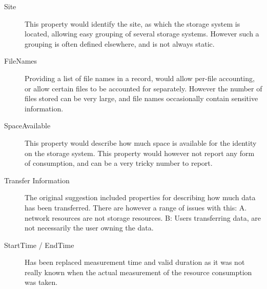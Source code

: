 \begin{description}

\item[Site] This property would identify the site, as which the storage system
is located, allowing easy grouping of several storage systems. However such a
grouping is often defined elsewhere, and is not always static.

\item[FileNames] Providing a list of file names in a record, would allow
per-file accounting, or allow certain files to be accounted for separately.
However the number of files stored can be very large, and file names occasionally
contain sensitive information.

\item[SpaceAvailable] This property would describe how much space is available
for the identity on the storage system. This property would however not report
any form of consumption, and can be a very tricky number to report.

\item[Transfer Information] The original suggestion included properties for
describing how much data has been transferred. There are however a range of
issues with this: A. network resources are not storage resources. B: Users
transferring data, are not necessarily the user owning the data.

\item[StartTime / EndTime] Has been replaced measurement time and valid
duration as it was not really known when the actual measurement of the resource
consumption was taken.

\end{description}


